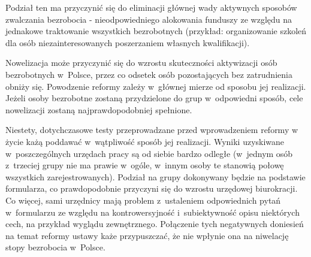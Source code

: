 \documentclass[12pt]{article}
\begin{document}
    Podział ten ma przyczynić się do eliminacji głównej wady aktywnych sposobów zwalczania bezrobocia - nieodpowiedniego alokowania funduszy ze względu na jednakowe traktowanie wszystkich bezrobotnych (przykład: organizowanie szkoleń dla osób niezainteresowanych poszerzaniem własnych kwalifikacji). 
    
    Nowelizacja może przyczynić się do wzrostu skuteczności aktywizacji osób bezrobotnych w~Polsce, przez co odsetek osób pozostających bez zatrudnienia obniży się. Powodzenie reformy zależy w~głównej mierze od sposobu jej realizacji. Jeżeli osoby bezrobotne zostaną przydzielone do grup w~odpowiedni sposób, cele nowelizacji zostaną najprawdopodobniej spełnione. 
    
    Niestety, dotychczasowe testy przeprowadzane przed wprowadzeniem reformy w życie każą poddawać w~wątpliwość sposób jej realizacji. Wyniki uzyskiwane w~poszczególnych urzędach pracy są od siebie bardzo odległe (w~jednym osób z~trzeciej grupy nie ma prawie w~ogóle, w~innym osoby te stanowią połowę wszystkich zarejestrowanych). Podział na grupy dokonywany będzie na podstawie formularza, co prawdopodobnie przyczyni się do wzrostu urzędowej biurokracji. Co więcej, sami urzędnicy mają problem z~ustaleniem odpowiednich pytań w~formularzu ze względu na kontrowersyjność i~subiektywność opisu niektórych cech, na przykład wyglądu zewnętrznego. Połączenie tych negatywnych doniesień na temat reformy ustawy każe przypuszczać, że nie wpłynie ona na niwelację stopy bezrobocia w~Polsce.

    
    
\end{document}
